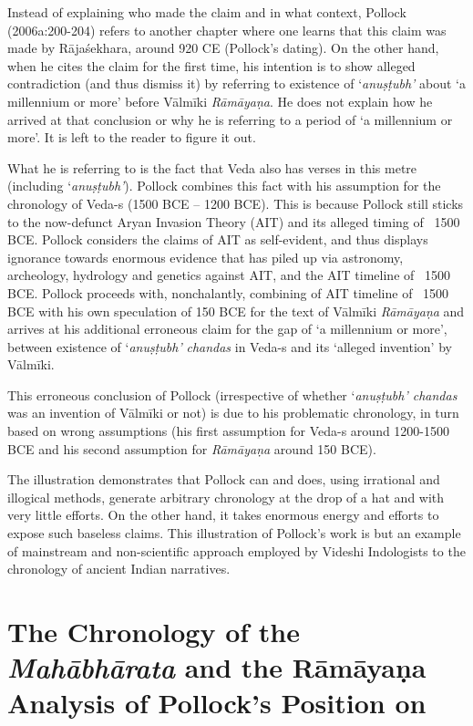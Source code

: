 Instead of explaining who made the claim and in what context, Pollock (2006a:200-204) refers to another chapter where one learns that this claim was made by Rājaśekhara, around 920 CE (Pollock’s dating). On the other hand, when he cites the claim for the first time, his intention is to show alleged contradiction (and thus dismiss it) by referring to existence of ‘\textit{anuṣṭubh’} about ‘a millennium or more’ before Vālmīki \textit{Rāmāyaṇa}. He does not explain how he arrived at that conclusion or why he is referring to a period of ‘a millennium or more’. It is left to the reader to figure it out.

What he is referring to is the fact that Veda also has verses in this metre (including ‘\textit{anuṣṭubh’}). Pollock combines this fact with his assumption for the chronology of Veda-s (1500 BCE – 1200 BCE). This is because Pollock still sticks to the now-defunct Aryan Invasion Theory (AIT) and its alleged timing of ~1500 BCE. Pollock considers the claims of AIT as self-evident, and thus displays ignorance towards enormous evidence that has piled up via astronomy, archeology, hydrology and genetics against AIT, and the AIT timeline of ~1500 BCE. Pollock proceeds with, nonchalantly, combining of AIT timeline of ~1500 BCE with his own speculation of 150 BCE for the text of Vālmīki \textit{Rāmāyaṇa} and arrives at his additional erroneous claim for the gap of ‘a millennium or more’, between existence of ‘\textit{anuṣṭubh’} \textit{chandas} in Veda-s and its ‘alleged invention’ by Vālmīki.

This erroneous conclusion of Pollock (irrespective of whether ‘\textit{anuṣṭubh’ chandas} was an invention of Vālmīki or not) is due to his problematic chronology, in turn based on wrong assumptions (his first assumption for Veda-s around 1200-1500 BCE and his second assumption for \textit{Rāmāyaṇa} around 150 BCE).

The illustration demonstrates that Pollock can and does, using irrational and illogical methods, generate arbitrary chronology at the drop of a hat and with very little efforts. On the other hand, it takes enormous energy and efforts to expose such baseless claims. This illustration of Pollock’s work is but an example of mainstream and non-scientific approach employed by Videshi Indologists to the chronology of ancient Indian narratives.


\section*{The Chronology of the \textit{Mahābhārata} and the Rāmāyaṇa Analysis of Pollock’s Position on}

